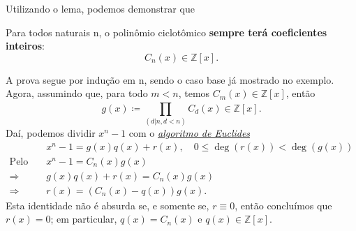 \documentclass[../algebraIII_notes.tex]{subfiles}
\begin{document}
Utilizando o lema, podemos demonstrar que
\begin{prop*}
	Para todos naturais n, o polinômio ciclotômico \textbf{sempre terá coeficientes inteiros}:
	\[
		C_{n}(x)\in \mathbb{Z}[x].
	\]
\end{prop*}
\begin{proof*}
	A prova segue por indução em n, sendo o caso base já mostrado no exemplo.
	Agora, assumindo que, para todo \(m < n\), temos \(C_{m}(x)\in \mathbb{Z}[x]\), então
	\[
		g(x)\coloneqq \prod\limits_{(d | n, d < n)}^{} C_{d}(x)\in \mathbb{Z}[x].
	\]
	Daí, podemos dividir \(x^{n}-1\) com o \hyperlink{euclides_algorithm}{\textit{algoritmo de Euclides}}
	\begin{align*}
		                   & x^{n}-1 = g(x)q(x) + r(x), \quad 0 \leq \deg{(r(x))} < \deg{(g(x))} \\
		\text{Pelo lema, } & x^{n}-1 = C_{n}(x)g(x)                                              \\
		\Rightarrow        & g(x)q(x) + r(x) = C_{n}(x)g(x)                                      \\
		\Rightarrow        & r(x) = (C_{n}(x)-q(x))g(x).
	\end{align*}
	Esta identidade não é absurda se, e somente se, \(r\equiv 0\), então concluímos que \(r(x) = 0\); em particular, \(q(x)=C_{n}(x)\) e \(q(x)\in \mathbb{Z}[x]\). \qedsymbol
\end{proof*}
\end{document}

